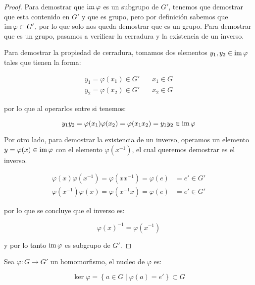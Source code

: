         \begin{proof}
            Para demostrar que $\operatorname{im}{\varphi}$ es un subgrupo de $G'$, tenemos que demostrar que esta contenido en $G'$ y que es grupo, pero por definición sabemos que $\operatorname{im}{\varphi} \subset G'$, por lo que solo nos queda demostrar que es un grupo.
            Para demostrar que es un grupo, pasamos a verificar la cerradura y la existencia de un inverso.

            Para demostrar la propiedad de cerradura, tomamos dos elementos $y_1, y_2 \in \operatorname{im}{\varphi}$ tales que tienen la forma:

            \begin{align*}
                y_1 = \varphi(x_1) \in G' &\quad x_1 \in G \\
                y_2 = \varphi(x_2) \in G' &\quad x_2 \in G
            \end{align*}

            por lo que al operarlos entre si tenemos:

            \begin{equation*}
                y_1 y_2 = \varphi(x_1) \varphi(x_2) = \varphi(x_1 x_2) = y_1 y_2 \in \operatorname{im}{\varphi}
            \end{equation*}

            Por otro lado, para demostrar la existencia de un inverso, operamos un elemento $y = \varphi(x) \in \operatorname{im}{\varphi}$ con el elemento $\varphi(x^{-1})$, el cual queremos demostrar es el inverso.

            \begin{align*}
                \varphi(x) \varphi(x^{-1}) = \varphi(x x^{-1}) = \varphi(e) &= e' \in G' \\
                \varphi(x^{-1}) \varphi(x) = \varphi(x^{-1} x) = \varphi(e) &= e' \in G'
            \end{align*}

            por lo que se concluye que el inverso es:

            \begin{equation*}
                \varphi(x)^{-1} = \varphi(x^{-1})
            \end{equation*}

            y por lo tanto $\operatorname{im}{\varphi}$ es subgrupo de $G'$.
        \end{proof}

        \begin{definicion}
            Sea $\varphi \colon G \to G'$ un homomorfismo, el nucleo de $\varphi$ es:

            \begin{equation}
                \ker{\varphi} = \left\{ a \in G \mid \varphi(a) = e' \right\} \subset G
            \end{equation}
        \end{definicion}

